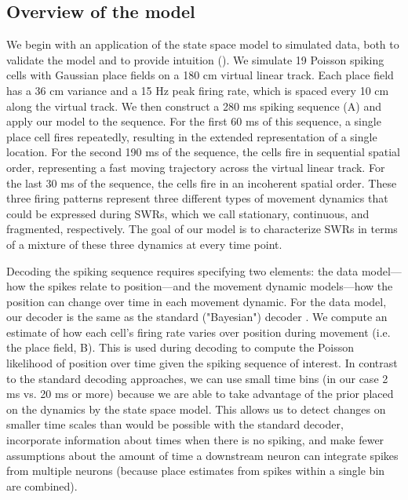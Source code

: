 \documentclass[9pt,lineno]{elife}
\begin{document}
\subsection*{Overview of the model}
We begin with an application of the state space model to simulated data, both to validate the model and to provide intuition (). We simulate 19 Poisson spiking cells with Gaussian place fields on a 180 cm virtual linear track. Each place field has a 36 cm variance and a 15 Hz peak firing rate, which is spaced every 10 cm along the virtual track. We then construct a 280 ms spiking sequence (A) and apply our model to the sequence. For the first 60 ms of this sequence, a single place cell fires repeatedly, resulting in the extended representation of a single location. For the second 190 ms of the sequence, the cells fire in sequential spatial order, representing a fast moving trajectory across the virtual linear track. For the last 30 ms of the sequence, the cells fire in an incoherent spatial order. These three firing patterns represent three different types of movement dynamics that could be expressed during SWRs, which we call stationary, continuous, and fragmented, respectively. The goal of our model is to characterize SWRs in terms of a mixture of these three dynamics at every time point.

Decoding the spiking sequence requires specifying two elements: the data model---how the spikes relate to position---and the movement dynamic models---how the position can change over time in each movement dynamic. For the data model, our decoder is the same as the standard ("Bayesian") decoder \citep{DavidsonHippocampalReplayExtended2009, PfeifferAutoassociativedynamicsgeneration2015, StellaHippocampalReactivationRandom2019}. We compute an estimate of how each cell's firing rate varies over position during movement (i.e. the place field, B). This is used during decoding to compute the Poisson likelihood of position over time given the spiking sequence of interest. In contrast to the standard decoding approaches, we can use small time bins (in our case 2 ms vs. 20 ms or more) because we are able to take advantage of the prior placed on the dynamics by the state space model. This allows us to detect changes on smaller time scales than would be possible with the standard decoder, incorporate information about times when there is no spiking, and make fewer assumptions about the amount of time a downstream neuron can integrate spikes from multiple neurons (because place estimates from spikes within a single bin are combined).
\end{document}
